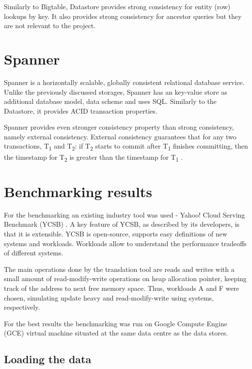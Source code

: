 \documentclass[bsc,frontabs,twoside,singlespacing,parskip,deptreport]{infthesis}     %
\begin{document}
Similarly to Bigtable, Datastore provides strong consistency for entity (row) lookups by key. It also provides strong consistency for ancestor queries but they are not relevant to the project.

\section{Spanner}

Spanner \citep{google-spanner} is a horizontally scalable, globally consistent relational database service. Unlike the previously discussed storages, Spanner has an key-value store as additional database model, data scheme and uses SQL. Similarly to the Datastore, it provides ACID transaction properties.

Spanner provides even stronger consistency property than strong consistency, namely external consistency. External consistency guarantees that for any two transactions, T\textsubscript{1} and T\textsubscript{2}: if T\textsubscript{2} starts to commit after T\textsubscript{1} finishes committing, then the timestamp for T\textsubscript{2} is greater than the timestamp for T\textsubscript{1} . 

\section{Benchmarking results}

For the benchmarking an existing industry tool was used - Yahoo! Cloud
Serving Benchmark (YCSB) \citep{ycsb}. A key feature of YCSB, as described by its developers, is that it is extensible. YCSB is open-source, supports easy definitions of new systems and workloads. Workloads allow to understand the performance tradeoffs of different systems.

The main operations done by the translation tool are reads and writes with a small amount of read-modify-write operations on heap allocation pointer, keeping track of the address to next free memory space. Thus, workloads A and F were chosen, simulating update heavy and read-modify-write using systems, respectively.

For the best results the benchmarking was run on Google Compute Engine (GCE) virtual machine situated at the same data centre as the data stores.

\subsection{Loading the data}
\end{document}
